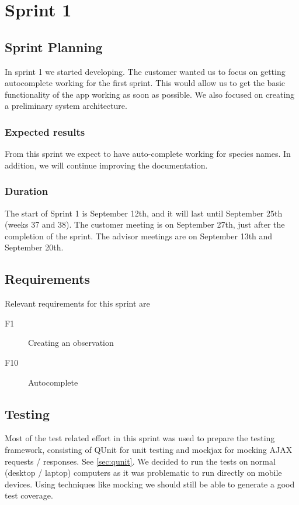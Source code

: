 \section{Sprint 1}

\subsection{Sprint Planning}

	In sprint 1 we started developing. The customer wanted us to focus on getting autocomplete working for the first sprint. This would allow us to get the basic functionality of the app working as soon as possible. We also focused on creating a preliminary system architecture.

	\subsubsection{Expected results}
  From this sprint we expect to have auto-complete working for species names. In addition, we will continue improving the documentation.
	
	\subsubsection{Duration}
	The start of Sprint 1 is September 12th, and it will last until September 25th (weeks 37 and 38). The customer meeting is on September 27th, just after the completion of the sprint. The advisor meetings are on September 13th and September 20th.
	
\subsection{Requirements}

	Relevant requirements for this sprint are 
  \begin{description}
  \item[F1] Creating an observation
  \item[F10] Autocomplete 
  \end{description}


\subsection{Testing}

	Most of the test related effort in this sprint was used to prepare the
	testing framework, consisting of QUnit for unit testing and mockjax for
	mocking AJAX requests / responses. See \ref{sec:qunit}. We decided to run
	the tests on normal (desktop / laptop) computers as it was problematic to
	run directly on mobile devices. Using techniques like mocking we should
	still be able to generate a good test coverage.

